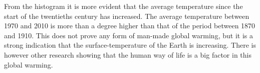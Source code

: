 From the histogram it is more evident that the average temperature since the start of the twentieths century has increased. The average temperature between 1970 and 2010 is more than a degree higher than that of the period between 1870 and 1910. This does not prove any form of man-made global warming, but it is a strong indication that the surface-temperature of the Earth is increasing. There is however other research showing that the human way of life is a big factor in this global warming.
